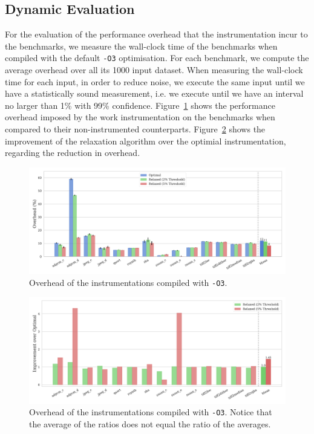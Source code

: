 \subsection{Dynamic Evaluation}

For the evaluation of the performance overhead that the instrumentation incur to the benchmarks, we measure the wall-clock time of the benchmarks when compiled with the default \texttt{-O3} optimisation.
For each benchmark, we compute the average overhead over all its 1000 input dataset.
When measuring the wall-clock time for each input, in order to reduce noise, we execute the same input until we have a statistically sound measurement, i.e. we execute until we have an interval no larger than 1\% with 99\% confidence.
Figure~\ref{fig:overhead-O3} shows the performance overhead imposed by the work instrumentation on the benchmarks when compared to their non-instrumented counterparts.
Figure~\ref{fig:overhead-improvement-O3} shows the improvement of the relaxation algorithm over the optimial instrumentation, regarding the reduction in overhead.

\begin{figure}[ht]
    \centering
    \includegraphics[width=\textwidth]{figs/overhead-O3.pdf}
    \caption{Overhead of the instrumentations compiled with {\texttt{-O3}}.}
    \label{fig:overhead-O3}
\end{figure}

\begin{figure}[ht]
    \centering
    \includegraphics[width=\textwidth]{figs/overhead-improvement-O3.pdf}
    \caption{Overhead of the instrumentations compiled with {\texttt{-O3}}.
             Notice that the average of the ratios does not equal the ratio of the averages.}
    \label{fig:overhead-improvement-O3}
\end{figure}

